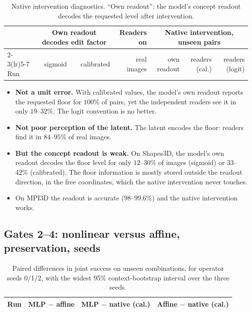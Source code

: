\documentclass[11pt,a4paper]{article}
\begin{document}
\begin{table}[H]
\centering\small
\begin{tabular}{lrrrrrr}
\toprule
& \multicolumn{2}{c}{Own readout decodes edit factor} & Readers on & \multicolumn{3}{c}{Native intervention, unseen pairs} \\
\cmidrule(lr){2-3}\cmidrule(lr){5-7}
Run & sigmoid & calibrated & real images & own readout & readers (cal.) & readers (logit) \\
\midrule

\bottomrule
\end{tabular}
\caption{Native intervention diagnostics. ``Own readout'': the model's concept readout decodes the requested level
after intervention.}
\label{tab:native}
\end{table}

\begin{itemize}
\item \textbf{Not a unit error.} With calibrated values, the model's own readout reports the requested floor for
  $100\%$ of pairs, yet the independent readers see it in only $19$--$32\%$. The logit convention is no better.
\item \textbf{Not poor perception of the latent.} The latent encodes the floor: readers find it in $84$--$95\%$ of
  real images.
\item \textbf{But the concept readout is weak.} On Shapes3D, the model's own readout decodes the floor level for only
  $12$--$30\%$ of images (sigmoid) or $33$--$42\%$ (calibrated). The floor information is mostly stored outside the
  readout direction, in the free coordinates, which the native intervention never touches.
\item On MPI3D the readout is accurate ($98$--$99.6\%$) and the native intervention works.
\end{itemize}

\subsection{Gates 2--4: nonlinear versus affine, preservation, seeds}

\begin{table}[H]
\centering\footnotesize
\begin{tabular}{llll}
\toprule
Run & MLP $-$ affine & MLP $-$ native (cal.) & Affine $-$ native (cal.) \\
\midrule

\bottomrule
\end{tabular}
\caption{Paired differences in joint success on unseen combinations, for operator seeds 0/1/2, with the widest
95\% context-bootstrap interval over the three seeds.}
\label{tab:boot}
\end{table}
\end{document}

